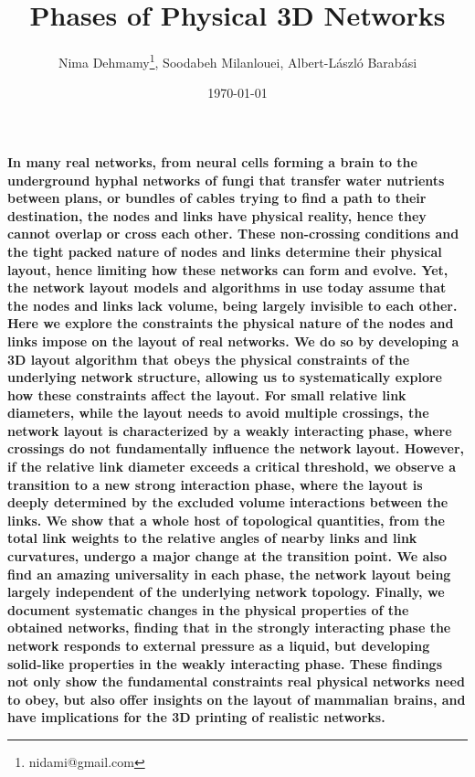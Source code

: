 \documentclass[nofootinbib,preprint,floatfix,endfloats]{revtex4} %
\begin{document}
\title{Phases of Physical 3D Networks}
\author{Nima Dehmamy\thanks{nidami@gmail.com}, Soodabeh Milanlouei, Albert-L\'aszl\'o Barab\'asi}
\date{\today}
\maketitle

{\bf 
In many real networks, from neural cells forming a brain to the underground hyphal networks of fungi that transfer water nutrients between plans, or bundles of cables trying to find a path to their destination, the nodes and links have physical reality, hence they cannot overlap or cross each other. 
These non-crossing conditions and the tight packed nature of nodes and links determine their physical layout, hence limiting how these networks can form and evolve. 
Yet, the network layout models and algorithms in use today assume that the nodes and links lack volume, being largely invisible to each other. 
Here we explore the constraints the physical nature of the nodes and links impose on the layout of real networks. 
We do so by developing a 3D layout algorithm that obeys the physical constraints of the underlying network structure, allowing us to systematically explore how these constraints affect the layout. 
For small relative link diameters, while the layout needs to avoid multiple crossings, the network layout is characterized by a weakly interacting phase, where crossings do not fundamentally influence the network layout. 
However, if the relative link diameter exceeds a critical threshold, we observe a transition to a new strong interaction phase, where the layout is deeply determined by the excluded volume interactions between the links. 
We show that a whole host of topological quantities, from the total link weights to the relative angles of nearby links and link curvatures, undergo a major change at the transition point. 
We also find an amazing universality in each phase, the network layout being largely independent of the underlying network topology. 
Finally, we document systematic changes in the physical properties of the obtained networks, finding that in the strongly interacting phase the network responds to external pressure as a liquid, but developing solid-like properties in the weakly interacting phase. 
These findings not only show the fundamental constraints real physical networks need to obey, but also offer insights on the layout of mammalian brains, and have implications for the 3D printing of realistic networks.
}
\end{document}
